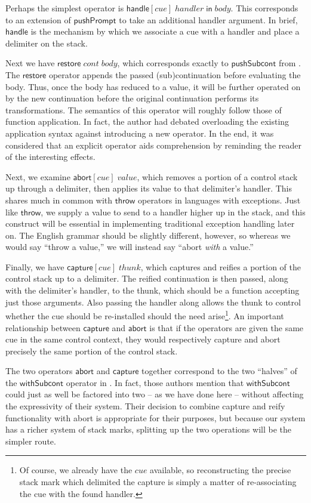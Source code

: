 \documentclass[11pt]{article}
\newcommand{\handle}[3]{\textsf{handle}[#1]\;#2\;\textsf{in}\;#3}
\newcommand{\abort}[2]{\textsf{abort}[#1]\;#2}
\newcommand{\capture}[2]{\textsf{capture}[#1]\;#2}
\newcommand{\pushSubcont}[2]{\textsf{restore}\;#1\;#2}
\begin{document}
Perhaps the simplest operator is $\handle{cue}{handler}{body}$.
This corresponds to an extension of $\textsf{pushPrompt}$ to take an additional handler argument.
In brief, $\textsf{handle}$ is the mechanism by which we associate a cue with a handler and place a delimiter on the stack.

Next we have $\pushSubcont{cont}{body}$, which corresponds exactly to $\textsf{pushSubcont}$ from \cite{MFDC}.
The $\textsf{restore}$ operator appends the passed (sub)continuation before evaluating the body.
Thus, once the body has reduced to a value, it will be further operated on by the new continuation before the original continuation performs its transformations.
The semantics of this operator will roughly follow those of function application.
In fact, the author had debated overloading the existing application syntax against introducing a new operator.
In the end, it was considered that an explicit operator aids comprehension by reminding the reader of the interesting effects.

Next, we examine $\abort{cue}{value}$, which removes a portion of a control stack up through a delimiter, then applies its value to that delimiter's handler.
This shares much in common with $\textsf{throw}$ operators in languages with exceptions.
Just like $\textsf{throw}$, we supply a value to send to a handler higher up in the stack, and this construct will be essential in implementing traditional exception handling later on.
The English grammar should be slightly different, however, so whereas we would say ``throw a value,'' we will instead say ``abort \emph{with} a value.''

Finally, we have $\capture{cue}{thunk}$, which captures and reifies a portion of the control stack up to a delimiter.
The reified continuation is then passed, along with the delimiter's handler, to the thunk, which should be a function accepting just those arguments.
Also passing the handler along allows the thunk to control whether the cue should be re-installed should the need arise\footnote{Of course, we already have the $cue$ available, so reconstructing the precise stack mark which delimited the capture is simply a matter of re-associating the cue with the found handler.}.
An important relationship between $\textsf{capture}$ and $\textsf{abort}$ is that if the operators are given the same cue in the same control context, they would respectively capture and abort precisely the same portion of the control stack.

The two operators $\textsf{abort}$ and $\textsf{capture}$ together correspond to the two ``halves'' of the $\textsf{withSubcont}$ operator in \cite{MFDC}.
In fact, those authors mention that $\textsf{withSubcont}$ could just as well be factored into two -- as we have done here -- without affecting the expressivity of their system.
Their decision to combine capture and reify functionality with abort is appropriate for their purposes, but because our system has a richer system of stack marks, splitting up the two operations will be the simpler route.
\end{document}
